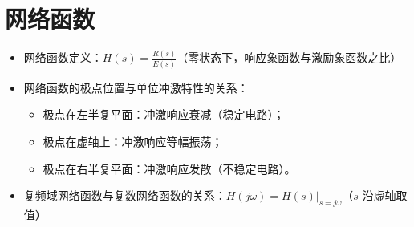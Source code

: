 \section{网络函数}
\begin{itemize}
    \item 网络函数定义：$H(s) = \frac{R(s)}{E(s)}$（零状态下，响应象函数与激励象函数之比）
    \item 网络函数的极点位置与单位冲激特性的关系：
          \begin{itemize}
              \item 极点在左半复平面：冲激响应衰减（稳定电路）；
              \item 极点在虚轴上：冲激响应等幅振荡；
              \item 极点在右半复平面：冲激响应发散（不稳定电路）。
          \end{itemize}
    \item 复频域网络函数与复数网络函数的关系：$H(j\omega) = H(s)\big|_{s=j\omega}$（$s$ 沿虚轴取值）
\end{itemize}
